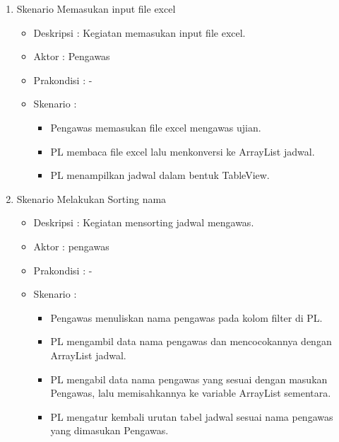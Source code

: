 \begin{enumerate}
	\item Skenario Memasukan input file excel \\
	{\renewcommand\labelitemi{}
		\begin{itemize}
			\item Deskripsi		: Kegiatan memasukan input file excel.
			\item Aktor				: Pengawas
			\item Prakondisi	: -
			\item Skenario		:
				\begin{itemize}
					\item Pengawas memasukan file excel mengawas ujian.
					\item PL membaca file excel lalu menkonversi ke ArrayList jadwal.
					\item PL menampilkan jadwal dalam bentuk TableView.
				\end{itemize}
		\end{itemize}
		}
		
	\item Skenario Melakukan Sorting nama
	{\renewcommand\labelitemi{}
	\begin{itemize}
			\item Deskripsi		: Kegiatan mensorting jadwal mengawas.
			\item Aktor				: pengawas
			\item Prakondisi	: -
			\item Skenario		:
				\begin{itemize}
					\item Pengawas menuliskan nama pengawas pada kolom filter di PL.
					\item PL mengambil data nama pengawas dan mencocokannya dengan ArrayList jadwal.
					\item PL mengabil data nama pengawas yang sesuai dengan masukan Pengawas, lalu memisahkannya ke variable ArrayList sementara.
					\item PL mengatur kembali urutan tabel jadwal sesuai nama pengawas yang dimasukan Pengawas.
				\end{itemize}
		\end{itemize}
		}
		

\end{enumerate}
